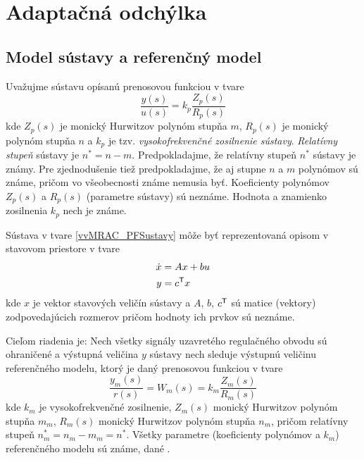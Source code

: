﻿\documentclass[a4paper, 10pt, ]{article}
\begin{document}
\section{Adaptačná odchýlka}



\subsection{Model sústavy a referenčný model}

Uvažujme sústavu opísanú prenosovou funkciou v tvare
\begin{equation} \label{vvMRAC_PFSustavy}
	\frac{y(s)}{u(s)} = 	k_p 	\frac{Z_p(s)}{R_p(s)}
\end{equation}
kde $Z_p(s)$ je monický Hurwitzov polynóm stupňa $m$, $R_p(s)$ je monický polynóm stupňa $n$ a $k_p$ je tzv. \emph{vysokofrekvenčné zosilnenie sústavy}. \emph{Relatívny stupeň} sústavy je $n^* = n - m$. Predpokladajme, že relatívny stupeň $n^*$ sústavy je známy. Pre zjednodušenie tiež predpokladajme, že aj stupne $n$ a $m$ polynómov sú známe, pričom vo všeobecnosti známe nemusia byť. Koeficienty polynómov $Z_p(s)$ a $R_p(s)$ (parametre sústavy) sú neznáme. Hodnota a znamienko zosilnenia $k_p$ nech je známe.

Sústava v tvare \eqref{vvMRAC_PFSustavy} môže byť reprezentovaná opisom v stavovom priestore v tvare
\begin{subequations}  \label{vvMRACStavOpisSust}
	\begin{align}
		 \dot x  &= A x + b u \\
		 y &= c^{\mathsf{T}} x
	\end{align}
\end{subequations}
kde $x$ je vektor stavových veličín sústavy a $A$, $b$, $c^{\mathsf{T}}$ sú matice (vektory) zodpovedajúcich rozmerov pričom hodnoty ich prvkov sú neznáme.

Cieľom riadenia je: Nech všetky signály uzavretého regulačného obvodu sú ohraničené a výstupná veličina $y$ sústavy nech sleduje výstupnú veličinu referenčného modelu, ktorý je daný prenosovou funkciou v tvare
\begin{equation} \label{vvMRAC_PFRefModel}
	\frac{y_m(s)}{r(s)} = W_m(s) = k_m \frac{Z_m(s)}{R_m(s)}
\end{equation}
kde $k_m$ je vysokofrekvenčné zosilnenie, $Z_m(s)$ monický Hurwitzov polynóm stupňa $m_m$, $R_m(s)$ monický Hurwitzov polynóm stupňa $n_m$, pričom relatívny stupeň $n^*_m = n_m - m_m = n^*$. Všetky parametre (koeficienty polynómov a $k_m$) referenčného modelu sú známe, dané .
\end{document}
